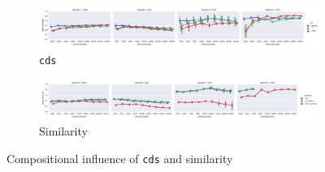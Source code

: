 \begin{figure}[b]
  \centering

  \begin{subfigure}[t]{\textwidth}
    \includegraphics[width=1.1\textwidth]{supplement/figures/compositional-interaction-cds}

  \caption{\texttt{cds}}
  \label{fig:compositional-cds}
  \end{subfigure}

  \begin{subfigure}[t]{\textwidth}
    \includegraphics[width=1.1\textwidth]{supplement/figures/compositional-interaction-similarity}

  \caption{Similarity}
  \label{fig:compositional-similarity}
  \end{subfigure}

  \caption{Compositional influence of \texttt{cds} and similarity}
\end{figure}
